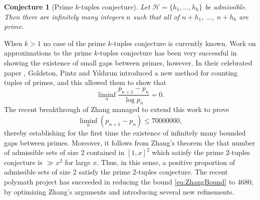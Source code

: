 \documentclass[12pt,a4paper]{amsart}
\theoremstyle{plain}
\newtheorem*{cnjctr}{Conjecture}
\numberwithin{sblmm}{thrm}
\numberwithin{equation}{section}
\begin{document}

\begin{cnjctr}[Prime $k$-tuples conjecture]
Let $\mathcal{H}=\{h_1,\dots,h_k\}$ be admissible. Then there are infinitely many integers $n$ such that all of $n+h_1$, $\dotsc$, $n+h_k$ are prime.
\end{cnjctr}
When $k>1$ no case of the prime $k$-tuples conjecture is currently known. Work on approximations to the prime $k$-tuples conjecture has been very successful in showing the existence of small gaps between primes, however. In their celebrated paper \cite{GPY}, Goldston, Pintz and Y\i ld\i r\i m introduced a new method for counting tuples of primes, and this allowed them to show that
\begin{equation}
\liminf_n \frac{p_{n+1}-p_n}{\log{p_n}}=0.
\end{equation}
The recent breakthrough of Zhang \cite{Zhang} managed to extend this work to prove
\begin{equation}
\liminf_n(p_{n+1}-p_n)\le \num{70000000},\label{eq:ZhangBound}
\end{equation}
thereby establishing for the first time the existence of infinitely many bounded gaps between primes. Moreover, it follows from Zhang's theorem the that number of admissible sets of size 2 contained in $[1,x]^2$ which satisfy the prime $2$-tuples conjecture is $\gg x^2$ for large $x$. Thus, in this sense, a positive proportion of admissible sets of size 2 satisfy the prime 2-tuples conjecture. The recent polymath project \cite{Polymath} has succeeded in reducing the bound \eqref{eq:ZhangBound} to 4680, by optimizing Zhang's arguments and introducing several new refinements.
\end{document}
